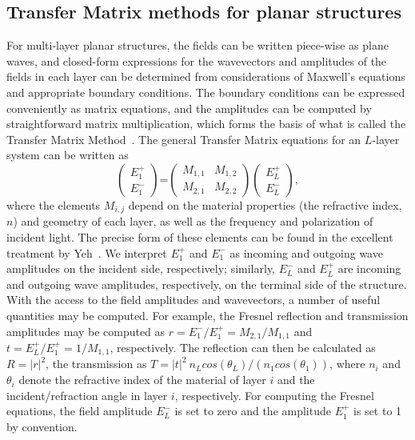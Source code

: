 \documentclass[10pt,letterpaper]{article}
\begin{document}
\subsection{Transfer Matrix methods for planar structures}
For multi-layer planar structures, the fields can be written piece-wise as plane waves, and closed-form expressions for the wavevectors
and amplitudes of the fields in each layer can be determined from considerations of Maxwell's equations and appropriate boundary
conditions.  The boundary conditions can be expressed conveniently as matrix equations, and the amplitudes can be computed by
straightforward matrix multiplication, which forms the basis of what is called the Transfer Matrix Method~\cite{Yeh}.  The general
Transfer Matrix equations for an $L$-layer system can be written as
\begin{equation}\label{Fresnel}
  \begin{pmatrix} E_1^+  \\ E_1^-  \end{pmatrix}
  \mbox{=}
  \begin{pmatrix}
  M_{1,1} & M_{1,2} \\
  M_{2,1} & M_{2,2}  \end{pmatrix}
  \begin{pmatrix} E_L^+ \\ E_L^-  \end{pmatrix},
\end{equation}
where the elements $M_{i,j}$ depend on the material properties (the refractive index, $n$) and geometry of each layer, as well as the
frequency and polarization of incident light.  The precise form of these elements can be found in the excellent treatment by Yeh~\cite{Yeh}.  We interpret $E_1^+$ and $E_1^-$
as incoming and outgoing wave amplitudes on the incident side, respectively; similarly, $E_L^-$ and $E_L^+$ are incoming and outgoing wave amplitudes, respectively,
on the terminal side of the structure.  With the access to the field amplitudes and wavevectors, a number of useful quantities may be computed.
For example, the Fresnel reflection and transmission amplitudes may be computed as $r =  E_1^-/E_1^+  =  M_{2,1}/M_{1,1}$  and
$t = E_L^+/E_1^+ =  1/M_{1,1}$, respectively.  The reflection can then be calculated as $R=|r|^2$, the transmission as
$T= |t|^2 \: n_L cos(\theta_L)/(n_1 cos(\theta_1))$, where $n_i$  and $\theta_i$ denote the refractive index of the material of layer $i$
and the incident/refraction angle in layer $i$, respectively.  For computing the Fresnel equations, 
the field amplitude $E_L^-$ is set to zero and the amplitude $E_1^+$ is set to 1 by convention.   
\end{document}
